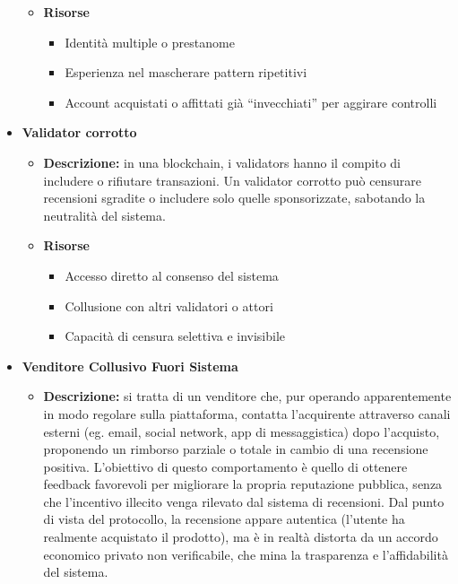 \begin{itemize}
\begin{itemize}
                    \item \textbf{Risorse}
                        \begin{itemize}
                            \item Identità multiple o prestanome
    
                            \item Esperienza nel mascherare pattern ripetitivi

                            \item Account acquistati o affittati già “invecchiati” per aggirare controlli
                        \end{itemize}
                \end{itemize}
    
            \item \textbf{Validator corrotto}
                \begin{itemize}                    
                    \item \textbf{Descrizione:}  in una blockchain, i validators hanno il compito di includere o rifiutare transazioni. Un validator corrotto può censurare recensioni sgradite o includere solo quelle sponsorizzate, sabotando la neutralità del sistema.
                    
                    \item \textbf{Risorse}
                        \begin{itemize}
                            \item Accesso diretto al consenso del sistema
        
                            \item Collusione con altri validatori o attori

                            \item Capacità di censura selettiva e invisibile
                        \end{itemize}
                \end{itemize}

            \item \textbf{Venditore Collusivo Fuori Sistema}
                \begin{itemize} 
                    \item \textbf{Descrizione:} si tratta di un venditore che, pur operando apparentemente in modo regolare sulla piattaforma, contatta l'acquirente attraverso canali esterni (eg. email, social network, app di messaggistica) dopo l'acquisto, proponendo un rimborso parziale o totale in cambio di una recensione positiva. L'obiettivo di questo comportamento è quello di ottenere feedback favorevoli per migliorare la propria reputazione pubblica, senza che l'incentivo illecito venga rilevato dal sistema di recensioni. Dal punto di vista del protocollo, la recensione appare autentica (l'utente ha realmente acquistato il prodotto), ma è in realtà distorta da un accordo economico privato non verificabile, che mina la trasparenza e l'affidabilità del sistema.
    

\end{itemize}
\end{itemize}
